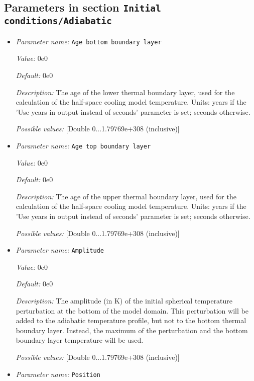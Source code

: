 \subsection{Parameters in section \tt Initial conditions/Adiabatic}
\label{parameters:Initial_20conditions/Adiabatic}

\begin{itemize}
\item {\it Parameter name:} {\tt Age bottom boundary layer}


{\it Value:} 0e0


{\it Default:} 0e0


{\it Description:} The age of the lower thermal boundary layer, used for the calculation of the half-space cooling model temperature. Units: years if the 'Use years in output instead of seconds' parameter is set; seconds otherwise.


{\it Possible values:} [Double 0...1.79769e+308 (inclusive)]
\item {\it Parameter name:} {\tt Age top boundary layer}


{\it Value:} 0e0


{\it Default:} 0e0


{\it Description:} The age of the upper thermal boundary layer, used for the calculation of the half-space cooling model temperature. Units: years if the 'Use years in output instead of seconds' parameter is set; seconds otherwise.


{\it Possible values:} [Double 0...1.79769e+308 (inclusive)]
\item {\it Parameter name:} {\tt Amplitude}


{\it Value:} 0e0


{\it Default:} 0e0


{\it Description:} The amplitude (in K) of the initial spherical temperature perturbation at the bottom of the model domain. This perturbation will be added to the adiabatic temperature profile, but not to the bottom thermal boundary layer. Instead, the maximum of the perturbation and the bottom boundary layer temperature will be used.


{\it Possible values:} [Double 0...1.79769e+308 (inclusive)]
\item {\it Parameter name:} {\tt Position}



\end{itemize}
